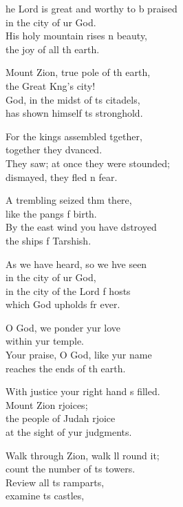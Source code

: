 \begin{psalmverse}
  \begin{patverse}
    he Lord is great and worthy to b praised\Med\\
in the city of ur God.\\
His holy mountain rises \pointup{\i}n beauty,\Med\\
the joy of all th earth.

Mount Zion, true pole of th earth,\Med\\
the Great K\pointup{\i}ng’s city!\\
God, in the midst of \pointup{\i}ts citadels,\Med\\
has shown himself \pointup{\i}ts stronghold.

For the kings assembled tgether,\Med\\
together they dvanced.\\
They saw; at once they were stounded;\Med\\
dismayed, they fled \pointup{\i}n fear.

A trembling seized thm there,\Med\\
like the pangs f birth.\\
By the east wind you have dstroyed\Med\\
the ships f Tarshish.

As we have heard, so we hve seen\Med\\
in the city of ur God,\\
in the city of the Lord f hosts\Med\\
which God upholds fr ever.

O God, we ponder yur love\Med\\
within yur temple.\\
Your praise, O God, like yur name\Med\\
reaches the ends of th earth.

With justice your right hand \pointup{\i}s filled.\Med\\
Mount Zion rjoices;\\
the people of Judah rjoice\Med\\
at the sight of yur judgments.

Walk through Zion, walk ll round it;\Med\\
count the number of \pointup{\i}ts towers.\\
Review all \pointup{\i}ts ramparts,\Med\\
examine \pointup{\i}ts castles,


\end{patverse}
\end{psalmverse}
